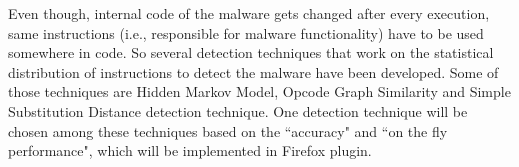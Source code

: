 Even though, internal code of the malware gets changed after every execution, same instructions (i.e., responsible for malware functionality) have to be used somewhere in code. So several detection techniques that work on the statistical distribution of instructions to detect the malware have been developed. Some of those techniques are Hidden Markov Model, Opcode Graph Similarity and Simple Substitution Distance detection technique. One detection technique will be chosen among these techniques based on the “accuracy" and “on the fly performance", which will be implemented in Firefox plugin.